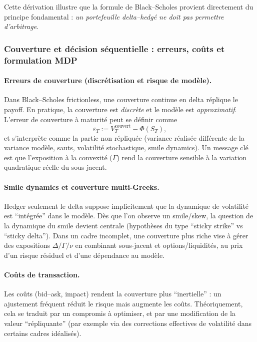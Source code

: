 \documentclass[11pt,a4paper]{article}
\newcommand{\1}{\mathbf{1}}
\begin{document}
\noindent
Cette dérivation illustre que la formule de Black--Scholes provient directement
du principe fondamental : \emph{un portefeuille delta--hedgé ne doit pas permettre d'arbitrage}.

\subsubsection{Couverture et d\'ecision s\'equentielle : erreurs, co\^uts et formulation MDP}

\paragraph{Erreurs de couverture (discr\'etisation et risque de mod\`ele).}
Dans Black--Scholes frictionless, une couverture continue en delta r\'eplique le payoff. En pratique, la couverture est
\emph{discr\`ete} et le mod\`ele est \emph{approximatif}. L'erreur de couverture \`a maturit\'e peut se d\'efinir comme
\[
\varepsilon_T := V_T^{\text{couvert}} - \Phi(S_T),
\]
et s'interpr\`ete comme la partie non r\'epliqu\'ee (variance r\'ealis\'ee diff\'erente de la variance mod\`ele, sauts,
volatilité stochastique, smile dynamics). Un message cl\'e est que l'exposition \`a la convexit\'e ($\Gamma$) rend la
couverture sensible \`a la variation quadratique r\'eelle du sous-jacent.

\paragraph{Smile dynamics et couverture multi-Greeks.}
Hedger seulement le delta suppose implicitement que la dynamique de volatilité est ``int\'egr\'ee'' dans le mod\`ele.
D\`es que l'on observe un smile/skew, la question de la dynamique du smile devient centrale (hypoth\`eses du type
``sticky strike'' vs ``sticky delta''). Dans un cadre incomplet, une couverture plus riche vise \`a g\'erer des
expositions $\Delta/\Gamma/\nu$ en combinant sous-jacent et options/liquidit\'es, au prix d'un risque r\'esiduel
et d'une d\'ependance au mod\`ele.

\paragraph{Co\^uts de transaction.}
Les co\^uts (bid--ask, impact) rendent la couverture plus ``inertielle'' : un ajustement fr\'equent r\'eduit le risque
mais augmente les co\^uts. Th\'eoriquement, cela se traduit par un compromis \`a optimiser, et par une modification de la
valeur ``r\'epliquante'' (par exemple via des corrections effectives de volatilité dans certains cadres id\'ealis\'es).
\end{document}
